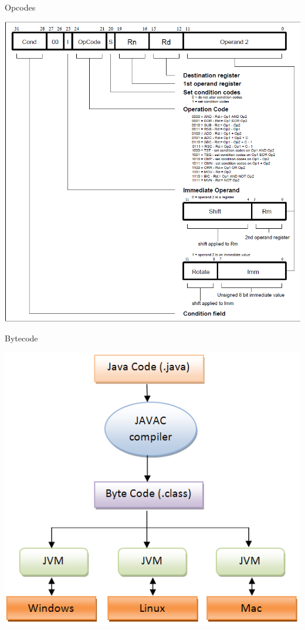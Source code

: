 \documentclass{beamer}
\begin{document}
\begin{frame}{Opcodes}

\begin{center}
\includegraphics[scale=0.3]{0cPOx.png}
\end{center}

\end{frame}

\begin{frame}{Bytecode}

\begin{center}
\includegraphics[scale=0.3]{java-program-execution2.png}
\end{center}

\end{frame}
\end{document}
